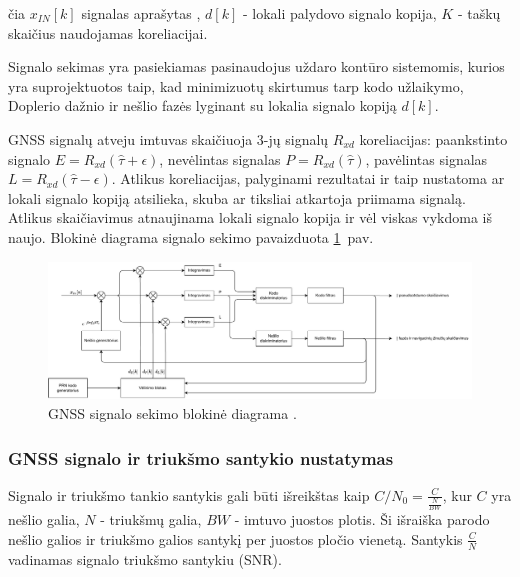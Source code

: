 \documentclass[main.tex]{subfiles}
\begin{document}
\noindent čia $x_{IN}[k]$ signalas aprašytas , $d[k]$ - lokali palydovo
signalo kopija, $K$ - taškų skaičius naudojamas koreliacijai.

Signalo sekimas yra pasiekiamas pasinaudojus uždaro kontūro sistemomis,
kurios yra su\-pro\-jek\-tuo\-tos taip, kad minimizuotų skirtumus tarp kodo užlaikymo,
Doplerio dažnio ir nešlio fazės lyginant su lokalia signalo kopiją $d[k]$.

GNSS signalų atveju imtuvas skaičiuoja 3-jų signalų $R_{xd}$ koreliacijas:
paankstinto signalo $E=R_{xd}(\hat{\tau} + \epsilon)$,
nevėlintas signalas $P=R_{xd}(\hat{\tau})$,
pavėlintas signalas $L=R_{xd}(\hat{\tau} - \epsilon)$.
Atlikus koreliacijas, palyginami rezultatai ir taip nustatoma
ar lokali signalo kopiją atsilieka, skuba ar tiksliai atkartoja
priimama signalą. Atlikus skaičiavimus atnaujinama lokali signalo kopija
ir vėl viskas vykdoma iš naujo. Blokinė diagrama signalo sekimo pavaizduota
\ref{fig:gnss_sdr_tracking_block}~pav.

\begin{figure}[h]
    \begin{centering}
    \includegraphics[scale=0.5]{drawings/tracking_diagram}
    \par\end{centering}
    \protect\caption{\label{fig:gnss_sdr_tracking_block}GNSS signalo sekimo blokinė diagrama \cite{gnss_sdr_web}.}
\end{figure}

\subsubsection{GNSS signalo ir triukšmo santykio nustatymas}\label{sec:gnss_snr}

Signalo ir triukšmo tankio santykis gali būti išreikštas kaip $C/N_0 = \frac{C}{\frac{N}{BW}}$,
kur $C$ yra nešlio galia, $N$ - triukšmų galia, $BW$ - imtuvo juostos plotis.
Ši išraiška parodo nešlio galios ir triukšmo galios santykį per juostos pločio vienetą.
Santykis $\frac{C}{N}$ vadinamas signalo triukšmo santykiu (SNR).
\end{document}
